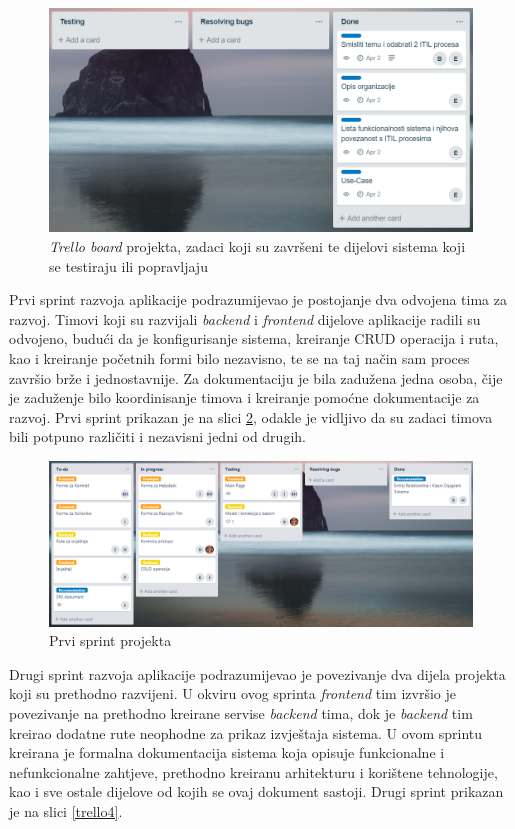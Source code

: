 \documentclass[12pt,a4paper]{article}
\begin{document}
\begin{figure}[H]
\center
\includegraphics[scale=0.6]{../res/Trello/trello2.PNG}
\caption{\textit{Trello board} projekta, zadaci koji su završeni te dijelovi sistema koji se testiraju ili popravljaju}
\label{trello2}
\end{figure}

Prvi sprint razvoja aplikacije podrazumijevao je postojanje dva odvojena tima za razvoj. Timovi koji su razvijali \textit{backend} i \textit{frontend} dijelove aplikacije radili su odvojeno, budući da je konfigurisanje sistema, kreiranje CRUD operacija i ruta, kao i kreiranje početnih formi bilo nezavisno, te se na taj način sam proces završio brže i jednostavnije. Za dokumentaciju je bila zadužena jedna osoba, čije je zaduženje bilo koordinisanje timova i kreiranje pomoćne dokumentacije za razvoj. Prvi sprint prikazan je na slici \ref{trello3}, odakle je vidljivo da su zadaci timova bili potpuno različiti i nezavisni jedni od drugih.

\begin{figure}[H]
\center
\includegraphics[scale=0.4]{../res/Trello/trello3.PNG}
\caption{Prvi sprint projekta}
\label{trello3}
\end{figure}

Drugi sprint razvoja aplikacije podrazumijevao je povezivanje dva dijela projekta koji su prethodno razvijeni. U okviru ovog sprinta \textit{frontend} tim izvršio je povezivanje na prethodno kreirane servise \textit{backend} tima, dok je \textit{backend} tim kreirao dodatne rute neophodne za prikaz izvještaja sistema. U ovom sprintu kreirana je formalna dokumentacija sistema koja opisuje funkcionalne i nefunkcionalne zahtjeve, prethodno kreiranu arhitekturu i korištene tehnologije, kao i sve ostale dijelove od kojih se ovaj dokument sastoji. Drugi sprint prikazan je na slici \ref{trello4}.
\end{document}
